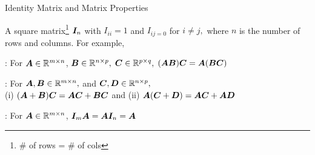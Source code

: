 \documentclass[handout,fleqn,aspectratio=169]{beamer}
\begin{document}
\begin{frame}{Identity Matrix and Matrix Properties}

\plitemsep 0.1in

\bci 
\item A square matrix\footnote{\# of rows = \# of cols} $\bm{I}_n$ with $I_{ii} = 1$ and $I_{ij=0}$ for $i \neq j,$ where $n$ is the number of rows and columns. For example, 

\bigskip
\item {}: For $\bm{A} \in {\mathbb R}^{m \times n}$, $\bm{B} \in {\mathbb R}^{n \times p},$ $\bm{C} \in {\mathbb R}^{p \times q},$ $(\bm{AB})\bm{C} = \bm{A}(\bm{BC})$

\item {}: For $\bm{A}, \bm{B} \in {\mathbb R}^{m \times n},$ and $\bm{C}, \bm{D} \in {\mathbb R}^{n \times p},$\\ \hspace{2.2cm}(i) $(\bm{A} + \bm{B})\bm{C} = \bm{AC} + \bm{BC}$ and (ii) $\bm{A}(\bm{C} + \bm{D}) = \bm{AC} + \bm{AD}$

\item {}: For $\bm{A} \in {\mathbb R}^{m \times n}$, $\bm{I}_m \bm{A} = \bm{A} \bm{I}_n = \bm{A}$

\eci
\end{frame}
\end{document}

